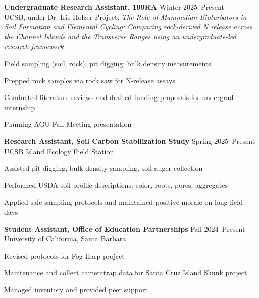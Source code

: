 \documentclass[letterpaper]{article}
\renewenvironment{itemize}{
  \begin{list}{}{
    \setlength{\leftmargin}{1.5em}
  }
}{
  \end{list}
}
\begin{document}
\begin{itemize}
  \item \textbf{Undergraduate Research Assistant, 199RA} \hfill Winter 2025--Present \\
    UCSB, under Dr. Iris Holzer  
   Project: \emph{The Role of Mammalian Bioturbators in Soil Formation and Elemental Cycling: Comparing rock-derived N release across the Channel Islands and the Transverse Ranges using an undergraduate-led research framework}  
    \begin{itemize}
      \item Field sampling (soil, rock); pit digging; bulk density measurements  
      \item Prepped rock samples via rock saw for N‐release assays  
      \item Conducted literature reviews and drafted funding proposals for undergrad internship  
      \item Planning AGU Fall Meeting presentation
    \end{itemize}
    
  \item \textbf{Research Assistant, Soil Carbon Stabilization Study} \hfill Spring 2025--Present \\
    UCSB Island Ecology Field Station  
    \begin{itemize}
      \item Assisted pit digging, bulk density sampling, soil auger collection  
      \item Performed USDA soil profile descriptions: color, roots, pores, aggregates  
      \item Applied safe sampling protocols and maintained positive morale on long field days
    \end{itemize}
    
 \item \textbf{Student Assistant, Office of Education Partnerships} \hfill Fall 2024--Present \\
  University of California, Santa Barbara \\
    \begin{itemize}
      \item Revised protocols for Fog Harp project
      \item Maintenance and collect cameratrap data for Santa Cruz Island Skunk project
      \item Managed inventory and provided peer support  
    \end{itemize}


\end{itemize}
\end{document}
